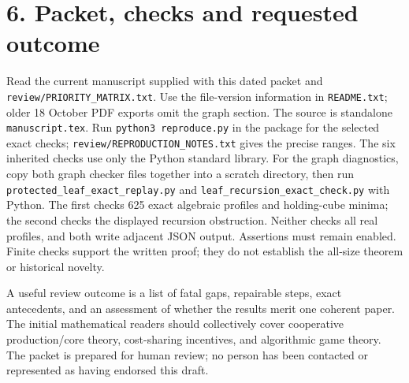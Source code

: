 \documentclass[11pt]{article}
\begin{document}
\section*{6. Packet, checks and requested outcome}
Read the current manuscript supplied with this dated packet and
\nolinkurl{review/PRIORITY_MATRIX.txt}. Use the file-version information in
\texttt{README.txt}; older 18 October PDF exports omit the graph section.
The source is standalone \texttt{manuscript.tex}. Run
\texttt{python3 reproduce.py} in the package for the selected exact checks;
\nolinkurl{review/REPRODUCTION_NOTES.txt} gives the precise ranges. The six inherited checks use only
the Python standard library. For the graph diagnostics, copy both graph checker files together into a
scratch directory, then run \texttt{protected\_leaf\_exact\_replay.py} and
\texttt{leaf\_recursion\_exact\_check.py} with Python. The first checks
625 exact algebraic profiles and holding-cube minima; the second checks
the displayed recursion obstruction. Neither checks all real profiles, and
both write adjacent JSON output. Assertions must remain enabled. Finite checks support the
written proof; they do not establish the all-size theorem or historical novelty.

A useful review outcome is a list of fatal gaps, repairable steps, exact
antecedents, and an assessment of whether the results merit one coherent
paper. The initial mathematical readers should collectively cover cooperative
production/core theory, cost-sharing incentives, and algorithmic game theory.
The packet is prepared for human review; no person has been contacted or
represented as having endorsed this draft.
\end{document}
